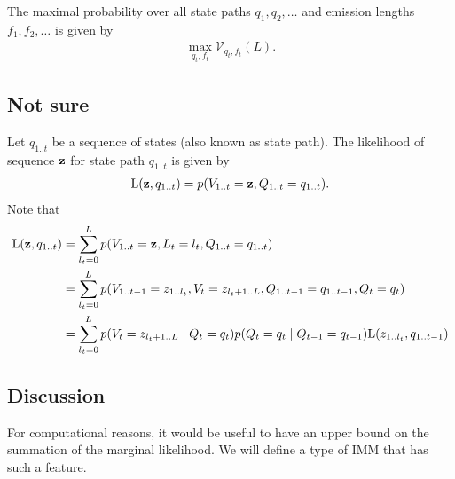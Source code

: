 The maximal probability over all state paths $q_1, q_2, \dots$ and emission lengths $f_1, f_2,
\dots$ is given by
\begin{align*}
  \max_{q_t, f_t}\mathcal{V}_{q_t,f_t}(L).
\end{align*}

\subsection{Not sure}

Let $q_{1..t}$ be a sequence of states (also known as state path).
The likelihood of sequence $\mathbf{z}$ for state path $q_{1..t}$ is given by
\begin{align*}
  \mathrm{L}(\mathbf{z}, q_{1..t}) = p(V_{1..t}=\mathbf{z}, Q_{1..t}=q_{1..t}).
\end{align*}
Note that
\begin{align*}
  \mathrm{L}(\mathbf{z}, q_{1..t}) &= \sum_{l_t=0}^L p(V_{1..t}=\mathbf{z}, L_t=l_t,
  Q_{1..t}=q_{1..t})\\
  &= \sum_{l_t=0}^L p(V_{1..t-1}=z_{1..l_t}, V_t=z_{l_t+1..L}, Q_{1..t-1}=q_{1..t-1}, Q_t=q_t)\\
  &= \sum_{l_t=0}^L p(V_t=z_{l_t+1..L} \;|\; Q_t=q_t) p(Q_t=q_t \;|\; Q_{t-1}=q_{t-1})
  \mathrm{L}(z_{1..l_t}, q_{1..t-1})
\end{align*}


\subsection{Discussion}

For computational reasons, it would be useful to have an upper bound on the summation of the
marginal likelihood.
We will define a type of IMM that has such a feature.

